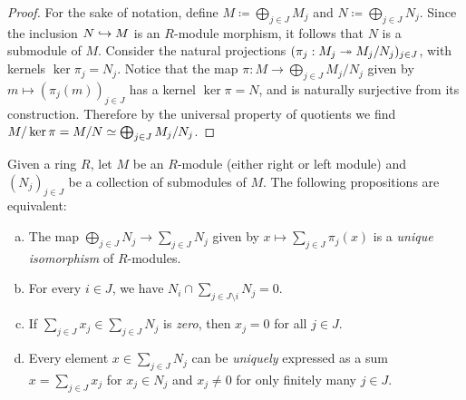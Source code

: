 \begin{proof}
    For the sake of notation, define \(M \coloneq \bigoplus_{j \in J} M_j\) and
    \(N \coloneq \bigoplus_{j \in J} N_j\). Since the inclusion \(N \hookrightarrow M\) is an
    \(R\)-module morphism, it follows that \(N\) is a submodule of \(M\). Consider
    the natural projections \((\pi_j: M_j \twoheadrightarrow M_j/N_j)_{j \in J}\), with kernels
    \(\ker \pi_j = N_j\). Notice that the map
    \(\pi: M \to \bigoplus_{j \in J} M_j/N_j\) given by
    \(m \mapsto (\pi_j(m))_{j \in J}\) has a kernel \(\ker \pi = N\), and is
    naturally surjective from its construction. Therefore by the universal property
    of quotients we find \(M/\ker \pi = M/N \simeq \bigoplus_{j \in J} M_j/N_j\).
\end{proof}

\begin{proposition}
    \label{prop:internal-sum-modules}
    Given a ring \(R\), let \(M\) be an \(R\)-module (either right or left module)
    and \((N_j)_{j \in J}\) be a collection of submodules of \(M\). The following
    propositions are equivalent:
    \begin{enumerate}[(a)]\setlength\itemsep{0em}
        \item The map \(\bigoplus_{j \in J} N_j \to \sum_{j \in J} N_j\) given by
              \(x \mapsto \sum_{j \in J} \pi_j(x)\) is a \emph{unique isomorphism} of
              \(R\)-modules.

        \item For every \(i \in J\), we have
              \(N_i \cap \sum_{j \in J \setminus i} N_j = 0\).

        \item If \(\sum_{j \in J} x_j \in \sum_{j \in J} N_j\) is \emph{zero}, then
              \(x_j = 0\) for all \(j \in J\).

        \item Every element \(x \in \sum_{j \in J} N_j\) can be \emph{uniquely}
              expressed as a sum \(x = \sum_{j \in J} x_j\) for \(x_j \in N_j\) and
              \(x_j \neq 0\) for only finitely many \(j \in J\).
    \end{enumerate}
\end{proposition}


